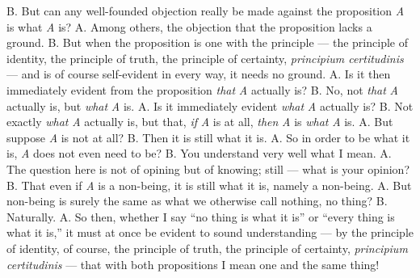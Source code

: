 \documentclass[12pt,a4paper]{book}
\begin{document}
B. But can any well-founded objection really be made against the proposition
\textit{A} is what \textit{A} is? A. Among others, the objection that the
proposition lacks a ground. B. But when the proposition is one with the
principle --- the principle of identity, the principle of truth, the principle
of certainty, \textit{principium certitudinis} --- and is of course
self-evident in every way, it needs no ground. A. Is it then immediately
evident from the proposition \emph{that} \textit{A} actually is? B. No, not
\emph{that} \textit{A} actually is, but \emph{what} \textit{A} is. A. Is it
immediately evident \emph{what} \textit{A} actually is? B. Not exactly
\emph{what} \textit{A} actually is, but that, \emph{if} \textit{A} is at all,
\emph{then} \textit{A} is \emph{what} \textit{A} is. A. But suppose \textit{A}
is not at all? B. Then it is still what it is. A. So in order to be what it is,
\textit{A} does not even need to be? B. You understand very well what I mean.
A. The question here is not of opining but of knowing;
still --- what is your opinion? B. That even if \textit{A} is a non-being, it
is still what it is, namely a non-being. A. But non-being is surely the same as
what we otherwise call nothing, no thing? B. Naturally. A. So then, whether I
say ``no thing is what it is'' or ``every thing is what it is,'' it must at
once be evident to sound understanding --- by the principle of identity, of
course, the principle of truth, the principle of certainty, \textit{principium
certitudinis} --- that with both propositions I mean one and the same thing!
\end{document}

